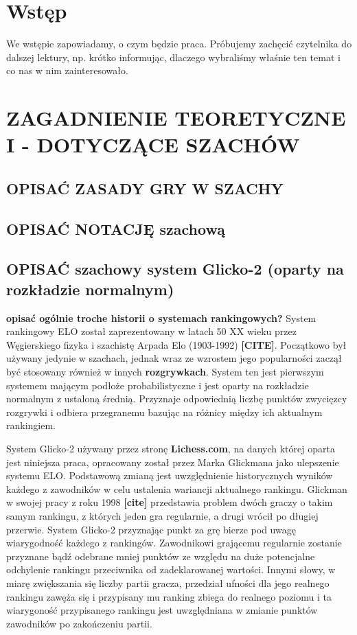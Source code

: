 \documentclass[inzynierska]{pwr_wmat_praca_dyplomowa}
\theoremstyle{plain}
\numberwithin{theorem}{chapter}
\theoremstyle{definition}
\numberwithin{theorem}{chapter}
\begin{document}

\frontmatter
\maketitle
\mainmatter
\tableofcontents

{\backmatter \chapter{Wstęp}}
We wstępie zapowiadamy, o czym będzie praca. Próbujemy zachęcić czytelnika do dalszej lektury, np. krótko informując, dlaczego wybraliśmy właśnie ten temat i co nas w nim zainteresowało.

\chapter{ZAGADNIENIE TEORETYCZNE I - DOTYCZĄCE SZACHÓW}
\section{OPISAĆ ZASADY GRY W SZACHY}
\section{OPISAĆ NOTACJĘ szachową}
\section{OPISAĆ szachowy system Glicko-2 (oparty na rozkładzie normalnym)}
\textbf{opisać ogólnie troche historii o systemach rankingowych?}
System rankingowy ELO został zaprezentowany w latach 50 XX wieku przez Węgierskiego fizyka i szachistę Arpada Elo (1903-1992) \textbf{[CITE]}. Początkowo był używany jedynie w szachach, jednak wraz ze wzrostem jego popularności zaczął być stosowany również w innych \textbf{rozgrywkach}. System ten jest pierwszym systemem mającym podłoże probabilistyczne i jest oparty na rozkładzie normalnym z ustaloną średnią. Przyznaje odpowiednią liczbę punktów zwycięzcy rozgrywki i odbiera przegranemu bazując na różnicy między ich aktualnym rankingiem.


System Glicko-2 używany przez stronę \textbf{Lichess.com}, na danych której oparta jest niniejsza praca, opracowany został przez Marka Glickmana jako ulepszenie systemu ELO. Podstawową zmianą jest uwzględnienie historycznych wyników każdego z zawodników w celu ustalenia wariancji aktualnego rankingu. Glickman w swojej pracy z roku 1998 \textbf{[cite]} przedstawia problem dwóch graczy o takim samym rankingu, z których jeden gra regularnie, a drugi wrócił po długiej przerwie. System Glicko-2 przyznając punkt za grę bierze pod uwagę wiarygodność każdego z rankingów. Zawodnikowi grającemu regularnie zostanie przyznane bądź odebrane mniej punktów ze względu na duże potencjalne odchylenie rankingu przeciwnika od zadeklarowanej wartości. Innymi słowy, w miarę zwiększania się liczby partii gracza, przedział ufności dla jego realnego rankingu zawęża się i przypisany mu ranking zbiega do realnego poziomu i ta wiarygoność przypisanego rankingu jest uwzględniana w zmianie punktów zawodników po zakończeniu partii.
\end{document}
